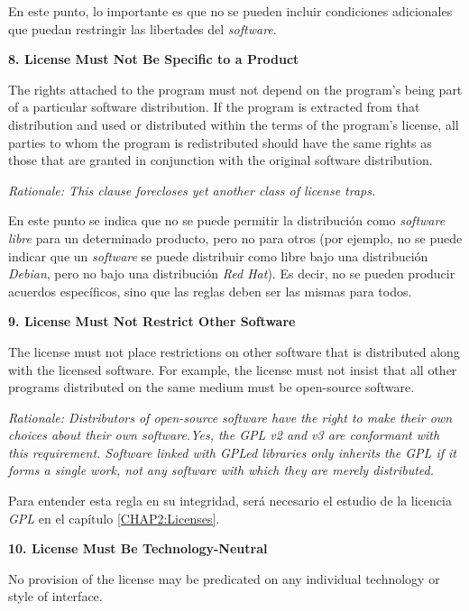 En este punto, lo importante es que no se pueden incluir condiciones adicionales
que puedan restringir las libertades del \textit{software}.\newline

{\bf 8. License Must Not Be Specific to a Product

The rights attached to the program must not depend on the program's being part
of a particular software distribution. If the program is extracted from that
distribution and used or distributed within the terms of the program's license,
all parties to whom the program is redistributed should have the same rights as
those that are granted in conjunction with the original software distribution.}

\textit{Rationale: This clause forecloses yet another class of license
traps.}\newline

En este punto se indica que no se puede permitir la distribución como
\textit{software libre} para un determinado producto, pero no para otros (por
ejemplo, no se puede indicar que un \textit{software} se puede distribuir como
libre bajo una distribución \textit{Debian}, pero no bajo una distribución
\textit{Red Hat}). Es decir, no se pueden producir acuerdos específicos, sino
que las reglas deben ser las mismas para todos.\newline

{\bf 9. License Must Not Restrict Other Software

The license must not place restrictions on other software that is distributed
along with the licensed software. For example, the license must not insist that
all other programs distributed on the same medium must be open-source software.}

\textit{Rationale: Distributors of open-source software have the right to make
their own choices about their own software.\newline Yes, the GPL v2 and v3 are
conformant with this requirement. Software linked with GPLed libraries only
inherits the GPL if it forms a single work, not any software with which they are
merely distributed.}\newline

Para entender esta regla en su integridad, será necesario el estudio de la
licencia \textit{GPL} en el capítulo \ref{CHAP2:Licenses}.\newline

{\bf 10. License Must Be Technology-Neutral

No provision of the license may be predicated on any individual technology or
style of interface.}

